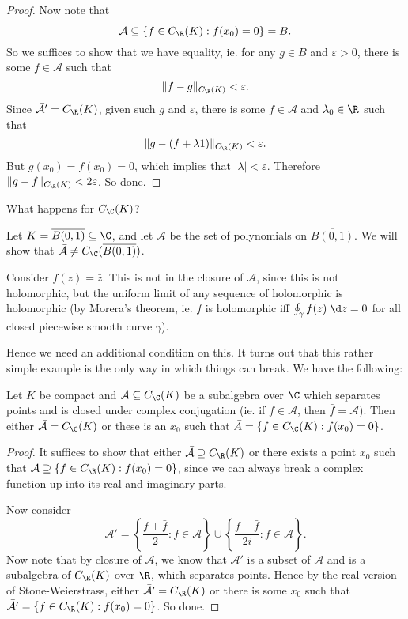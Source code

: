 \documentclass[a4paper]{article}
\begin{document}
\begin{proof}
  Now note that
  \[
    \bar{\mathcal{A}} \subseteq \{f \in C_\R(K): f(x_0) = 0\} = B.
  \]
  So we suffices to show that we have equality, ie. for any $g \in B$ and $\varepsilon > 0$, there is some $f \in \mathcal{A}$ such that
  \[
    \|f - g\|_{C_\R(K)} < \varepsilon.
  \]
  Since $\bar{\mathcal{A}}' = C_\R(K)$, given such $g$ and $\varepsilon$, there is some $f \in \mathcal{A}$ and $\lambda_0 \in \R$ such that
  \[
    \|g - (f + \lambda 1)\|_{C_{\R}(K)} < \varepsilon.
  \]
  But $g(x_0) = f(x_0) = 0$, which implies that $|\lambda| < \varepsilon$. Therefore $\|g - f\|_{C_\R(K)} < 2 \varepsilon$. So done.
\end{proof}

What happens for $C_\C(K)$?
\begin{eg}
  Let $K = \overline{B(0, 1)} \subseteq \C$, and let $\mathcal{A}$ be the set of polynomials on $\overline{B(0, 1)}$. We will show that $\bar{\mathcal{A}} \not= C_{\C}(\overline{B(0, 1)})$.

  Consider $f(z) = \bar{z}$. This is not in the closure of $\mathcal{A}$, since this is not holomorphic, but the uniform limit of any sequence of holomorphic is holomorphic (by Morera's theorem, ie. $f$ is holomorphic iff $\oint_\gamma f(z) \;\d z = 0$ for all closed piecewise smooth curve $\gamma$).
\end{eg}
Hence we need an additional condition on this. It turns out that this rather simple example is the only way in which things can break. We have the following:

\begin{thm}
  Let $K$ be compact and $\mathcal{A} \subseteq C_\C(K)$ be a subalgebra over $\C$ which separates points and is closed under complex conjugation (ie. if $f \in \mathcal{A}$, then $\bar{f} = \mathcal{A}$). Then either $\bar{\mathcal{A}} = C_\C(K)$ or these is an $x_0$ such that $\bar{A} = \{f \in C_\C(K): f(x_0) = 0\}$.
\end{thm}

\begin{proof}
  It suffices to show that either $\bar{\mathcal{A}} \supseteq C_{\R}(K)$ or there exists a point $x_0$ such that $\bar{\mathcal{A}} \supseteq \{f \in C_{\R}(K): f(x_0) = 0\}$, since we can always break a complex function up into its real and imaginary parts.

  Now consider
  \[
    \mathcal{A}' = \left\{\frac{f + \bar{f}}{2}: f \in \mathcal{A}\right\} \cup \left\{\frac{f - \bar{f}}{2i}: f \in \mathcal{A}\right\}.
  \]
  Now note that by closure of $\mathcal{A}$, we know that $\mathcal{A}'$ is a subset of $\mathcal{A}$ and is a subalgebra of $C_\R(K)$ over $\R$, which separates points. Hence by the real version of Stone-Weierstrass, either $\bar{\mathcal{A}'} = C_\R(K)$ or there is some $x_0$ such that $\bar{\mathcal{A}'} = \{f \in C_\R(K): f(x_0) = 0\}$. So done.
\end{proof}
\end{document}
